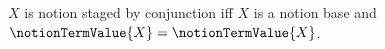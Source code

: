 

\begin{definition}\label{notion_staged_conjunction}
    $X$ is notion staged by conjunction iff
        $X$ is a notion base and
        $\notionTermValue{X}=\notionTermValue{X}$.
\end{definition}
